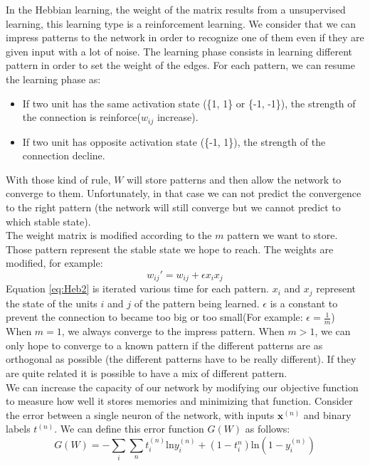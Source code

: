   In the Hebbian learning, the weight of the matrix results from a unsupervised learning, this learning type is a reinforcement learning. We consider that we can impress patterns to the network in order to recognize one of them even if they are given input with a lot of noise. The learning phase consists in learning different pattern in order to set the weight of the edges. For each pattern, we can resume the learning phase as:
  \begin{itemize}
    \item If two unit has the same activation state (\{1, 1\} or \{-1, -1\}), the strength of the connection is reinforce($w_{ij}$ increase).
    \item If two unit has opposite activation state (\{-1, 1\}), the strength of the connection decline.
  \end{itemize}
  With those kind of rule, $W$ will store patterns and then allow the network to converge to them. Unfortunately, in that case we can not predict the convergence to the right pattern (the network will still converge but we cannot predict to which stable state). \\

  The weight matrix is modified according to the $m$ pattern we want to store. Those pattern represent the stable state we hope to reach. The weights are modified, for example:
  \begin{equation}
  \label{eq:Heb2}
  w_{ij}' = w_{ij} + \epsilon x_i x_j
  \end{equation}
  Equation \ref{eq:Heb2} is iterated various time for each pattern. $x_i$ and $x_j$ represent the state of the units $i$ and $j$ of the pattern being learned. $\epsilon$ is a constant to prevent the connection to became too big or too small(For example: $\epsilon = \frac{1}{m}$)\\

  When $m = 1$, we always converge to the impress pattern. When $m > 1$, we can only hope to converge to a known pattern if the different patterns are as orthogonal as possible (the different patterns have to be really different). If they are quite related it is possible to have a mix of different pattern.\\

  We can increase the capacity of our network by modifying our objective function to measure how well it stores memories and minimizing that function. Consider the error between a single neuron of the network, with inputs $\textbf{x}^{(n)}$ and binary labels $t^{(n)}$. We can define this error function $G(W)$ as follows:
\begin{equation}
\label{eq:opt1}
G(W) = -\sum_{i} \sum_{n} t_{i}^{(n)}\text{ln}y_{i}^{(n)} + (1 - t_{i}^{n})\text{ln}(1 - y_{i}^{(n)})
\end{equation}

